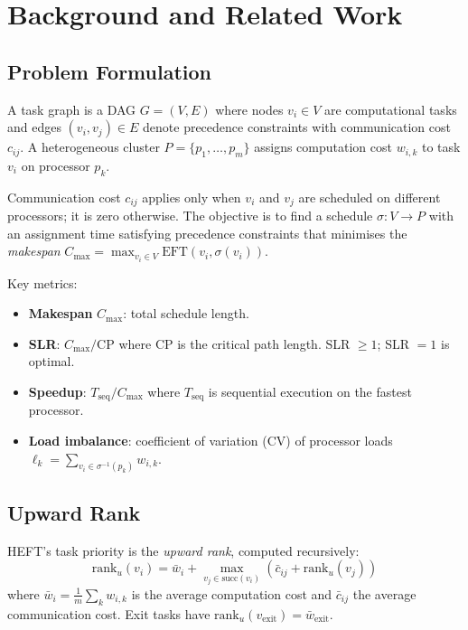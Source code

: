 \documentclass[conference]{IEEEtran}
\begin{document}
\section{Background and Related Work}

\subsection{Problem Formulation}

A task graph is a DAG $G = (V, E)$ where nodes $v_i \in V$ are
computational tasks and edges $(v_i, v_j) \in E$ denote precedence
constraints with communication cost $c_{ij}$. A heterogeneous cluster
$P = \{p_1, \ldots, p_m\}$ assigns computation cost $w_{i,k}$ to task
$v_i$ on processor $p_k$.

Communication cost $c_{ij}$ applies only when $v_i$ and $v_j$ are
scheduled on different processors; it is zero otherwise. The objective is
to find a schedule $\sigma: V \to P$ with an assignment time satisfying
precedence constraints that minimises the \textit{makespan}
$C_{\max} = \max_{v_i \in V} \text{EFT}(v_i, \sigma(v_i))$.

Key metrics:
\begin{itemize}
  \item \textbf{Makespan} $C_{\max}$: total schedule length.
  \item \textbf{SLR}: $C_{\max} / \text{CP}$ where CP is the critical
        path length. SLR $\geq 1$; SLR $= 1$ is optimal.
  \item \textbf{Speedup}: $T_{\text{seq}} / C_{\max}$ where $T_{\text{seq}}$
        is sequential execution on the fastest processor.
  \item \textbf{Load imbalance}: coefficient of variation (CV) of processor
        loads $\ell_k = \sum_{v_i \in \sigma^{-1}(p_k)} w_{i,k}$.
\end{itemize}

\subsection{Upward Rank}

HEFT's task priority is the \textit{upward rank}, computed recursively:
\begin{equation}
  \text{rank}_u(v_i) = \bar{w}_i + \max_{v_j \in \text{succ}(v_i)}
  \left( \bar{c}_{ij} + \text{rank}_u(v_j) \right)
  \label{eq:rank_u}
\end{equation}
where $\bar{w}_i = \frac{1}{m}\sum_k w_{i,k}$ is the average computation
cost and $\bar{c}_{ij}$ the average communication cost. Exit tasks have
$\text{rank}_u(v_{\text{exit}}) = \bar{w}_{\text{exit}}$.
\end{document}
